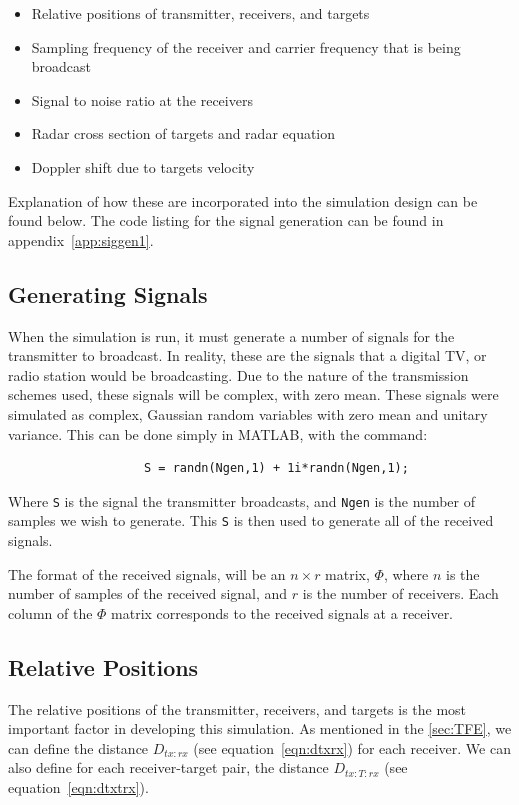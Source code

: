 \documentclass[12pt,openany,a4paper]{book}
\begin{document}
\begin{itemize}
	\item{Relative positions of transmitter, receivers, and targets}
	\item{Sampling frequency of the receiver and carrier frequency that is being broadcast}
	\item{Signal to noise ratio at the receivers}
	\item{Radar cross section of targets and radar equation}
	\item{Doppler shift due to targets velocity}
\end{itemize}

Explanation of how these are incorporated into the simulation design can be found below. The code listing for the signal generation can be found in appendix~\ref{app:siggen1}.

\subsection{Generating Signals}
When the simulation is run, it must generate a number of signals for the transmitter to broadcast. In reality, these are the signals that a digital TV, or radio station would be broadcasting. Due to the nature of the transmission schemes used, these signals will be complex, with zero mean. These signals were simulated as complex, Gaussian random variables with zero mean and unitary variance. This can be done simply in MATLAB, with the command:

\begin{verbatim}
                   S = randn(Ngen,1) + 1i*randn(Ngen,1);
\end{verbatim}

Where \verb+S+ is the signal the transmitter broadcasts, and \verb+Ngen+ is the number of samples we wish to generate. This \verb+S+ is then used to generate all of the received signals.

\bigskip

The format of the received signals, will be an $n\times r$ matrix, $\Phi$, where $n$ is the number of samples of the received signal, and $r$ is the number of receivers. Each column of the $\Phi$ matrix corresponds to the received signals at a receiver.

\subsection{Relative Positions}
The relative positions of the transmitter, receivers, and targets is the most important factor in developing this simulation. As mentioned in the \ref{sec:TFE}, we can define the distance $D_{tx\colon rx}$ (see equation~\ref{eqn:dtxrx}) for each receiver. We can also define for each receiver-target pair, the distance $D_{tx\colon T\colon rx}$ (see equation~\ref{eqn:dtxtrx}). 
\end{document}
